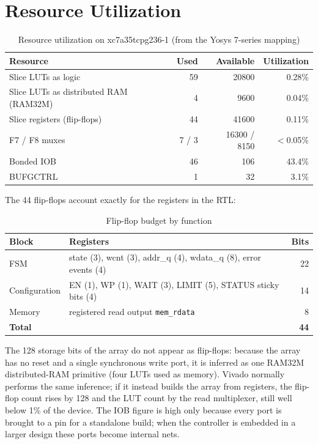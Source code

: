 \documentclass[11pt,a4paper]{article}
\newcommand{\sig}[1]{\texttt{#1}}
\begin{document}
\section{Resource Utilization}
\begin{table}[H]
\centering
\caption{Resource utilization on xc7a35tcpg236-1 (from the Yosys 7-series mapping)}
\label{tab:util}
\small
\begin{tabular}{@{}l r r r@{}}
\toprule
\textbf{Resource} & \textbf{Used} & \textbf{Available} & \textbf{Utilization} \\
\midrule
Slice LUTs as logic & 59 & 20800 & 0.28\% \\
Slice LUTs as distributed RAM (RAM32M) & 4 & 9600 & 0.04\% \\
Slice registers (flip-flops) & 44 & 41600 & 0.11\% \\
F7 / F8 muxes & 7 / 3 & 16300 / 8150 & $<$0.05\% \\
Bonded IOB & 46 & 106 & 43.4\% \\
BUFGCTRL & 1 & 32 & 3.1\% \\
\bottomrule
\end{tabular}
\end{table}

The 44 flip-flops account exactly for the registers in the RTL:

\begin{table}[H]
\centering
\caption{Flip-flop budget by function}
\label{tab:ff}
\small
\begin{tabular}{@{}l l r@{}}
\toprule
\textbf{Block} & \textbf{Registers} & \textbf{Bits} \\
\midrule
FSM & state (3), wcnt (3), addr\_q (4), wdata\_q (8), error events (4) & 22 \\
Configuration & EN (1), WP (1), WAIT (3), LIMIT (5), STATUS sticky bits (4) & 14 \\
Memory & registered read output \sig{mem\_rdata} & 8 \\
\midrule
\textbf{Total} & & \textbf{44} \\
\bottomrule
\end{tabular}
\end{table}

The 128 storage bits of the array do not appear as flip-flops: because the array has no reset and a single synchronous write port, it is inferred as one RAM32M distributed-RAM primitive (four LUTs used as memory). Vivado normally performs the same inference; if it instead builds the array from registers, the flip-flop count rises by 128 and the LUT count by the read multiplexer, still well below 1\% of the device. The IOB figure is high only because every port is brought to a pin for a standalone build; when the controller is embedded in a larger design these ports become internal nets.
\end{document}
